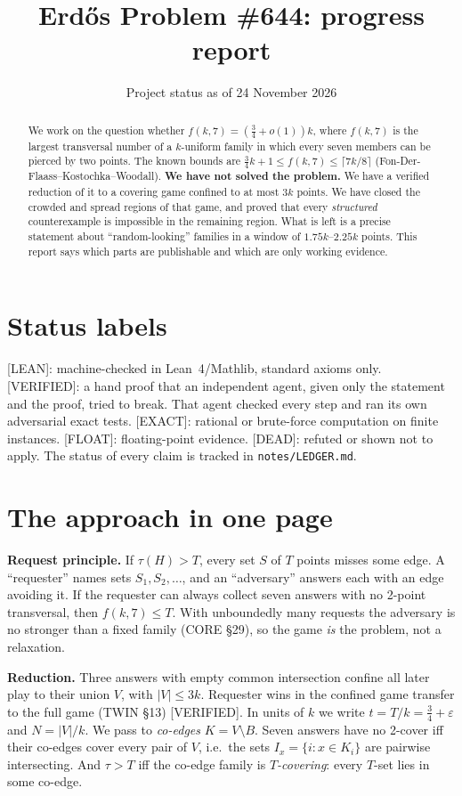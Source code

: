 \documentclass[11pt]{article}
\title{Erd\H{o}s Problem \#644: progress report}
\author{Project status as of 24 November 2026}
\date{}
\newcommand{\st}[1]{\textsf{\small[#1]}}
\begin{document}
\maketitle

\begin{abstract}
We work on the question whether $f(k,7)=(\tfrac34+o(1))k$, where $f(k,7)$ is the largest transversal number of a
$k$-uniform family in which every seven members can be pierced by two points. The known bounds are
$\tfrac34k+1\le f(k,7)\le\lceil 7k/8\rceil$ (Fon-Der-Flaass--Kostochka--Woodall). \textbf{We have not solved the
problem.} We have a verified reduction of it to a covering game confined to at most $3k$ points. We have closed the
crowded and spread regions of that game, and proved that every \emph{structured} counterexample is impossible in the
remaining region. What is left is a precise statement about ``random-looking'' families in a window of
$1.75k$--$2.25k$ points. This report says which parts are publishable and which are only working evidence.
\end{abstract}

\section*{Status labels}
\st{LEAN}: machine-checked in Lean~4/Mathlib, standard axioms only.
\st{VERIFIED}: a hand proof that an independent agent, given only the statement and the proof, tried to break.
That agent checked every step and ran its own adversarial exact tests.
\st{EXACT}: rational or brute-force computation on finite instances.
\st{FLOAT}: floating-point evidence.
\st{DEAD}: refuted or shown not to apply.
The status of every claim is tracked in \texttt{notes/LEDGER.md}.

\section{The approach in one page}
\textbf{Request principle.} If $\tau(H)>T$, every set $S$ of $T$ points misses some edge. A ``requester'' names sets
$S_1,S_2,\dots$, and an ``adversary'' answers each with an edge avoiding it. If the requester can always collect seven
answers with no 2-point transversal, then $f(k,7)\le T$. With unboundedly many requests the adversary is no stronger
than a fixed family (CORE \S29), so the game \emph{is} the problem, not a relaxation.

\textbf{Reduction.} Three answers with empty common intersection confine all later play to their union $V$, with
$|V|\le 3k$. Requester wins in the confined game transfer to the full game (TWIN \S13) \st{VERIFIED}. In units of $k$
we write $t=T/k=\tfrac34+\varepsilon$ and $N=|V|/k$. We pass to \emph{co-edges} $K=V\setminus B$. Seven answers have
no 2-cover iff their co-edges cover every pair of $V$, i.e.\ the sets $I_x=\{i:x\in K_i\}$ are pairwise intersecting.
And $\tau>T$ iff the co-edge family is \emph{$T$-covering}: every $T$-set lies in some co-edge.
\end{document}
